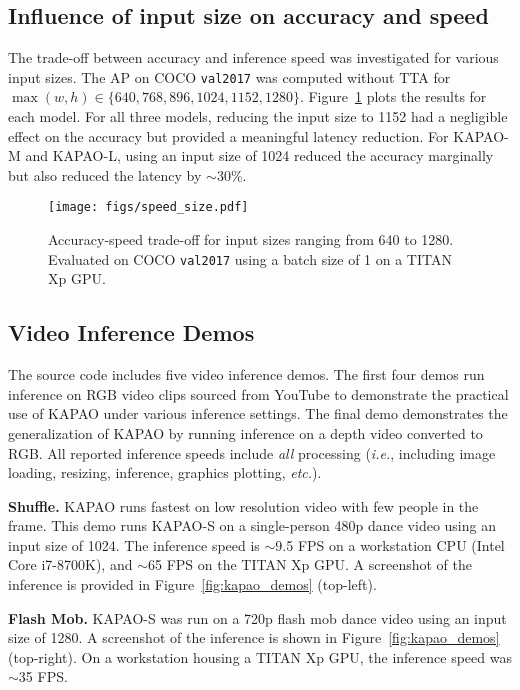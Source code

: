 \documentclass[runningheads]{llncs}
\newcommand{\ie}{\textit{i.e.}}
\newcommand{\etc}{\textit{etc.}}
\begin{document}
\subsection{Influence of input size on accuracy and speed}
The trade-off between accuracy and inference speed was investigated for various input sizes. The AP on COCO \texttt{val2017} was computed without TTA for $\max(w, h) \in \{640, 768, 896, 1024, 1152, 1280\}$. Figure~\ref{fig:speed_size} plots the results for each model. For all three models, reducing the input size to 1152 had a negligible effect on the accuracy but provided a meaningful latency reduction. For KAPAO-M and KAPAO-L, using an input size of 1024 reduced the accuracy marginally but also reduced the latency by $\sim$30\%.

\begin{figure}[t]
\centering
    \texttt{[image: figs/speed\_size.pdf]}
\caption{Accuracy-speed trade-off for input sizes ranging from 640 to 1280. Evaluated on COCO \texttt{val2017} using a batch size of 1 on a TITAN Xp GPU.}
\label{fig:speed_size}
\end{figure}

\subsection{Video Inference Demos}
The source code includes five video inference demos. The first four demos run inference on RGB video clips sourced from YouTube to demonstrate the practical use of KAPAO under various inference settings. The final demo demonstrates the generalization of KAPAO by running inference on a depth video converted to RGB.  All reported inference speeds include \textit{all} processing (\ie, including image loading, resizing, inference, graphics plotting, \etc).

\medskip\noindent\textbf{Shuffle.} KAPAO runs fastest on low resolution video with few people in the frame. This demo runs KAPAO-S on a single-person 480p dance video using an input size of 1024. The inference speed is $\sim$9.5 FPS on a workstation CPU (Intel Core i7-8700K), and $\sim$65 FPS on the TITAN Xp GPU. A screenshot of the inference is provided in Figure~\ref{fig:kapao_demos} (top-left).

\medskip\noindent\textbf{Flash Mob.} KAPAO-S was run on a 720p flash mob dance video using an input size of 1280. A screenshot of the inference is shown in Figure~\ref{fig:kapao_demos} (top-right). On a workstation housing a TITAN Xp GPU, the inference speed was $\sim$35 FPS.
\end{document}
